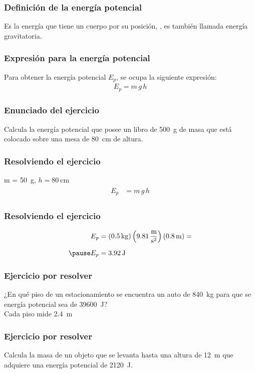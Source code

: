 \documentclass[14pt]{beamer}
\begin{document}
\begin{frame}
\frametitle{Definición de la energía potencial}
Es la energía que tiene un cuerpo por su posición, , es también llamada energía gravitatoria.
\end{frame}
\begin{frame}
\frametitle{Expresión para la energía potencial}
Para obtener la energía potencial $E_{p}$, se ocupa la siguiente expresión:
\pause
\begin{align*}
E_{p} = m \, g \, h
\end{align*}
\end{frame}
\begin{frame}
\frametitle{Enunciado del ejercicio}
Calcula la energía potencial que posee un libro de \SI{500}{\gram} de masa que está colocado sobre una mesa de \SI{80}{\centi\meter} de altura.
\end{frame}
\begin{frame}
\frametitle{Resolviendo el ejercicio}
 \pause m = \SI{50}{\gram}, \pause $h = \SI{80}{\centi\meter}$
\\
\bigskip
\pause
{}
\begin{eqnarray*}
\begin{aligned}
E_{p} &= m \, g \, h
\end{aligned}
\end{eqnarray*}
\end{frame}
\begin{frame}
\frametitle{Resolviendo el ejercicio}
\pause
\begin{eqnarray*}
\begin{aligned}
E_{p} &= (\SI{0.5}{\kilo\gram}) \left( \SI[per-mode=fraction]{9.81}{\meter\per\square\second} \right) (\SI{0.8}{\meter}) = \\[0.5em] \pause
E_{p} &= \SI{3.92}{\joule}
\end{aligned}
\end{eqnarray*}
\end{frame}
\begin{frame}
\frametitle{Ejercicio por resolver}
¿En qué piso de un estacionamiento se encuentra un auto de \SI{840}{\kilo\gram} para que se energía potencial sea de \SI{39600}{\joule}?
\\
\bigskip
Cada piso mide \SI{2.4}{\meter}
\end{frame}
\begin{frame}
\frametitle{Ejercicio por resolver}
Calcula la masa de un objeto que se levanta hasta una altura de \SI{12}{\meter} que adquiere una energía potencial de \SI{2120}{\joule}.
\end{frame}
\end{document}

